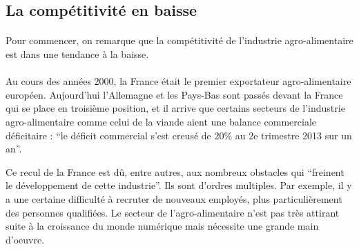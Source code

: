 \documentclass[a4paper,12pt]{report}
\begin{document}
		\subsection{La compétitivité en baisse}
			\paragraph{}Pour commencer, on remarque que la compétitivité de l’industrie agro-alimentaire est dans une tendance à la baisse.
			
			\paragraph{}Au cours des années 2000, la France était le premier exportateur agro-alimentaire européen. Aujourd'hui l’Allemagne et les Pays-Bas sont passés devant la France qui se place en troisième position, et il arrive que certains secteurs de l’industrie agro-alimentaire comme celui de la viande aient une balance commerciale déficitaire : “le déficit commercial s'est creusé de 20\% au 2e trimestre 2013 sur un an”\cite{DeficitCommercialViandeAggrave}.

			Ce recul de la France est dû, entre autres, aux nombreux obstacles qui “freinent le développement de cette industrie”\cite{StimulerCompetitiviteEntreprises}. Ils sont d’ordres multiples. Par exemple, il y a une certaine difficulté à recruter de nouveaux employés, plus particulièrement des personnes qualifiées. Le secteur de l’agro-alimentaire n’est pas très attirant suite à la croissance du monde numérique mais nécessite une grande main d’oeuvre.
\end{document}
